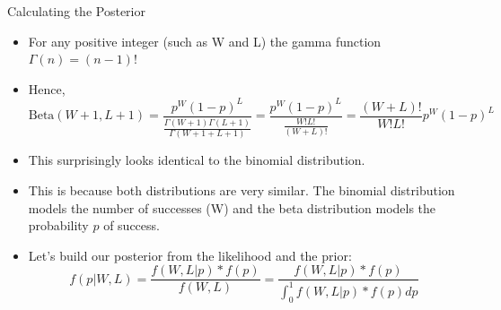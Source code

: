 \documentclass[handout]{beamer}
\begin{document}
\begin{frame}{Calculating the Posterior}
\scriptsize{

\begin{itemize}
\item For any positive integer (such as W and L) the gamma function $\Gamma(n) = (n-1)!$

\item Hence, \begin{displaymath}
\text{Beta}(W+1 , L+1) = \frac{p^W(1-p)^L}{\frac{\Gamma(W+1)\Gamma(L+1)}{\Gamma(W+1 + L+1)}} = \frac{p^W(1-p)^L}{\frac{W!L!}{(W+L)!}} = \frac{(W+L)!}{W!L!}p^W(1-p)^L
\end{displaymath}

\item This surprisingly looks identical to the binomial distribution.

\item This is because both distributions are very similar. The binomial distribution models the number of successes (W) and the beta distribution models the probability $p$ of success. 


\item Let's build our posterior from the likelihood and the prior:
\begin{displaymath}
f(p|W,L) = \frac{f(W,L|p)*f(p)}{f(W,L)} = \frac{f(W,L|p)*f(p)}{\int_0^1f(W,L|p)*f(p)dp} 
\end{displaymath}

\end{itemize}

} 

\end{frame}
\end{document}
